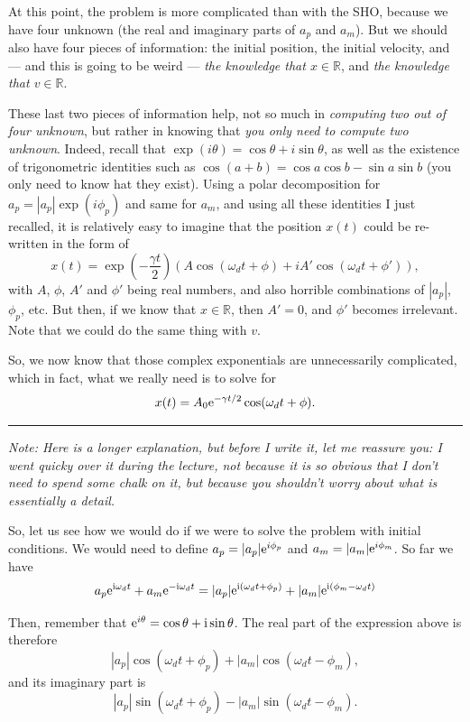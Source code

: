 \documentclass[11pt]{article}
\begin{document}
    At this point, the problem is more complicated than with the SHO,
because we have four unknown (the real and imaginary parts of \(a_p\)
and \(a_m\)). But we should also have four pieces of information: the
initial position, the initial velocity, and --- and this is going to be
weird --- \emph{the knowledge that \(x\in \mathbb R\)}, and \emph{the
knowledge that \(v\in \mathbb R\)}.

These last two pieces of information help, not so much in
\emph{computing two out of four unknown}, but rather in knowing that
\emph{you only need to compute two unknown}. Indeed, recall that
\(\exp(i\theta) = \cos\theta + i\sin\theta\), as well as the existence
of trigonometric identities such as
\(\cos(a+b) = \cos a \cos b - \sin a \sin b\) (you only need to know hat
they exist). Using a polar decomposition for
\(a_p = |a_p|\exp(i\phi_p)\) and same for \(a_m\), and using all these
identities I just recalled, it is relatively easy to imagine that the
position \(x(t)\) could be re-written in the form of
\[ x(t) = \exp\left(- \frac{\gamma t}2\right)\left(A\cos(\omega_d t + \phi) + i A'\cos(\omega_d t + \phi')\right), \]
with \(A\), \(\phi\), \(A'\) and \(\phi'\) being real numbers, and also
horrible combinations of \(|a_p|\), \(\phi_p\), etc. But then, if we
know that \(x\in \mathbb R\), then \(A' = 0\), and \(\phi'\) becomes
irrelevant. Note that we could do the same thing with \(v\).

So, we now know that those complex exponentials are unnecessarily
complicated, which in fact, what we really need is to solve for
\[ x(t) = A_0\textrm{e}^{- \gamma t/2}\cos(\omega_d t +\phi).\]

    \begin{center}\rule{0.5\linewidth}{\linethickness}\end{center}

\emph{Note: Here is a longer explanation, but before I write it, let me
reassure you: I went quicky over it during the lecture, not because it
is so obvious that I don't need to spend some chalk on it, but because
you shouldn't worry about what is essentially a detail.}

So, let us see how we would do if we were to solve the problem with
initial conditions. We would need to define
\(a_p = |a_p|\textrm{e}^{i\phi_p}\) and \(a_m = |a_m|\textrm{e}^{i\phi_m}\). So far
we have
\[a_p\textrm{e}^{\mathrm i\omega_d t} + a_m\textrm{e}^{-\mathrm i\omega_d t} = |a_p|\textrm{e}^{\mathrm i(\omega_d t +\phi_p)} + |a_m|\textrm{e}^{\mathrm i(\phi_m - \omega_d t)}\]

Then, remember that \(\textrm{e}^{i\theta} = \cos\theta + \mathrm i\sin\theta\).
The real part of the expression above is therefore
\[ |a_p|\cos(\omega_d t +\phi_p) + |a_m|\cos(\omega_d t - \phi_m), \]
and its imaginary part is
\[ |a_p|\sin(\omega_d t +\phi_p) - |a_m|\sin(\omega_d t - \phi_m). \]
\end{document}
